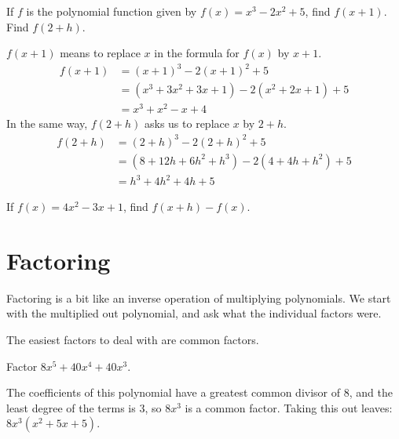 \documentclass{ximera}
\begin{document}
\begin{example}
	If $f$ is the polynomial function given by $f(x) = x^3-2x^2 +5$, find $f(x+1)$.  Find $f(2+h)$.
	\begin{explanation}
		$f(x+1)$ means to replace $x$ in the formula for $f(x)$ by $x+1$.
		\begin{align*}
			f(x+1) &= (x+1)^3 - 2(x+1)^2 + 5 \\
				&= (x^3 + 3x^2 + 3x + 1) - 2(x^2 + 2x + 1) + 5\\
				&= x^3 + x^2 -x + 4
		\end{align*}
		In the same way, $f(2+h)$ asks us to replace $x$ by $2+h$.
		\begin{align*}
			f(2+h) &= (2+h)^3 - 2(2+h)^2 + 5\\
				&= (8+12h + 6h^2 + h^3) - 2(4+4h+h^2) + 5\\
				&= h^3 + 4h^2+4h+5
		\end{align*}
	\end{explanation}
\end{example}

\begin{problem}
	If $f(x)=4x^2-3x+1$, find $f(x+h)-f(x)$.
	\begin{multipleChoice}
	\end{multipleChoice}
\end{problem}

\section{Factoring}
Factoring is a bit like an inverse operation of multiplying polynomials.  We start with the multiplied out polynomial, and ask what the individual factors were.

The easiest factors to deal with are common factors.
\begin{example}
	Factor $8x^5 + 40x^4 + 40x^3$.
	\begin{explanation}
		The coefficients of this polynomial have a greatest common divisor of $8$, and the least degree of the terms is $3$, so
		$8x^3$ is a common factor.  Taking this out leaves:
		$\displaystyle 8x^3( x^2+5x+5)$.
	\end{explanation}
\end{example}
\end{document}
